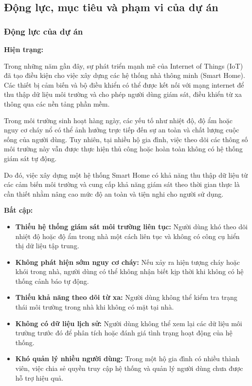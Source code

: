 \documentclass[a4paper,twoside]{article}
\begin{document}
\subsection{Động lực, mục tiêu và phạm vi của dự án}

\subsubsection{Động lực của dự án}

\textbf{Hiện trạng:}

Trong những năm gần đây, sự phát triển mạnh mẽ của Internet of Things (IoT)
đã tạo điều kiện cho việc xây dựng các hệ thống nhà thông minh (Smart Home).
Các thiết bị cảm biến và bộ điều khiển có thể được kết nối với mạng internet
để thu thập dữ liệu môi trường và cho phép người dùng giám sát, điều khiển
từ xa thông qua các nền tảng phần mềm.

Trong môi trường sinh hoạt hàng ngày, các yếu tố như nhiệt độ, độ ẩm
hoặc nguy cơ cháy nổ có thể ảnh hưởng trực tiếp đến sự an toàn
và chất lượng cuộc sống của người dùng. Tuy nhiên, tại nhiều hộ gia đình,
việc theo dõi các thông số môi trường này vẫn được thực hiện thủ công
hoặc hoàn toàn không có hệ thống giám sát tự động.

Do đó, việc xây dựng một hệ thống Smart Home có khả năng thu thập dữ liệu
từ các cảm biến môi trường và cung cấp khả năng giám sát theo thời gian thực
là cần thiết nhằm nâng cao mức độ an toàn và tiện nghi cho người sử dụng.

\textbf{Bất cập:}

\begin{itemize}

\item \textbf{Thiếu hệ thống giám sát môi trường liên tục:}  
Người dùng khó theo dõi nhiệt độ hoặc độ ẩm trong nhà một cách liên tục
và không có công cụ hiển thị dữ liệu tập trung.

\item \textbf{Không phát hiện sớm nguy cơ cháy:}  
Nếu xảy ra hiện tượng cháy hoặc khói trong nhà, người dùng có thể không
nhận biết kịp thời khi không có hệ thống cảnh báo tự động.

\item \textbf{Thiếu khả năng theo dõi từ xa:}  
Người dùng không thể kiểm tra trạng thái môi trường trong nhà khi
không có mặt tại nhà.

\item \textbf{Không có dữ liệu lịch sử:}  
Người dùng không thể xem lại các dữ liệu môi trường trước đó để
phân tích hoặc đánh giá tình trạng hoạt động của hệ thống.

\item \textbf{Khó quản lý nhiều người dùng:}  
Trong một hộ gia đình có nhiều thành viên, việc chia sẻ quyền truy cập
hệ thống và quản lý người dùng chưa được hỗ trợ hiệu quả.

\end{itemize}
\end{document}
